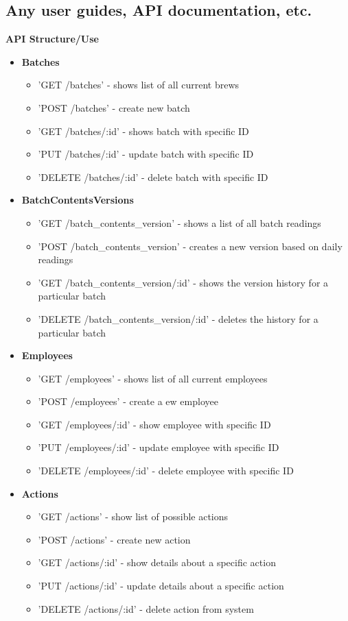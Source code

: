 \documentclass[draftclsnofoot,onecolumn,letterpaper,10pt]{IEEEtran}
\begin{document}
	\subsection{Any user guides, API documentation, etc.}
	\textbf{API Structure/Use}
	\begin{itemize}
		\item \textbf{Batches}
			\begin{itemize}
				\item 'GET /batches' - shows list of all current brews
				\item 'POST /batches' - create new batch
				\item 'GET /batches/:id' - shows batch with specific ID
				\item 'PUT /batches/:id' - update batch with specific ID
				\item 'DELETE /batches/:id' - delete batch with specific ID
			\end{itemize}

		\item \textbf{BatchContentsVersions}
			\begin{itemize}
				\item 'GET /batch\_contents\_version' - shows a list of all batch readings
				\item 'POST /batch\_contents\_version' - creates a new version based on daily readings
				\item 'GET  /batch\_contents\_version/:id' - shows the version history for a particular batch
				\item 'DELETE /batch\_contents\_version/:id' - deletes the history for a particular batch
			\end{itemize}

		\item \textbf{Employees}
			\begin{itemize}
				\item 'GET /employees' - shows list of all current employees
				\item 'POST /employees' - create a ew employee
				\item 'GET /employees/:id' - show employee with specific ID
				\item 'PUT /employees/:id' - update employee with specific ID
				\item 'DELETE /employees/:id' - delete employee with specific ID
			\end{itemize}

		\item \textbf{Actions}
			\begin{itemize}
				\item 'GET /actions' - show list of possible actions
				\item 'POST /actions' - create new action
				\item 'GET /actions/:id' - show details about a specific action
				\item 'PUT /actions/:id' - update details about a specific action
				\item 'DELETE /actions/:id' - delete action from system
			\end{itemize}


\end{itemize}
\end{document}
